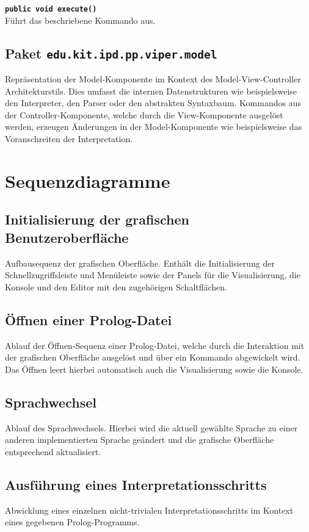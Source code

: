 \documentclass[parskip=full,11pt,twoside]{scrartcl}
\begin{document}
\textbf{\texttt{public void execute()}}\\
Führt das beschriebene Kommando aus.

\subsection{Paket \texttt{edu.kit.ipd.pp.viper.model}}
Repräsentation der Model-Komponente im Kontext des Model-View-Controller Architekturstils. Dies umfasst die internen Datenstrukturen wie beispielsweise den Interpreter, den Parser oder den abstrakten Syntaxbaum. Kommandos aus der Controller-Komponente, welche durch die View-Komponente ausgelöst werden, erzeugen Änderungen in der Model-Komponente wie beispielsweise das Voranschreiten der Interpretation.

\section{Sequenzdiagramme}

\subsection{Initialisierung der grafischen Benutzeroberfläche}
Aufbausequenz der grafischen Oberfläche. Enthält die Initialisierung der Schnellzugriffsleiste und Menüleiste sowie der Panels für die Visualisierung, die Konsole und den Editor mit den zugehörigen Schaltflächen.

\subsection{Öffnen einer Prolog-Datei}
Ablauf der Öffnen-Sequenz einer Prolog-Datei, welche durch die Interaktion mit der grafischen Oberfläche ausgelöst und über ein Kommando abgewickelt wird. Das Öffnen leert hierbei automatisch auch die Visualisierung sowie die Konsole.

\subsection{Sprachwechsel}
Ablauf des Sprachwechsels. Hierbei wird die aktuell gewählte Sprache zu einer anderen implementierten Sprache geändert und die grafische Oberfläche entsprechend aktualisiert.

\subsection{Ausführung eines Interpretationsschritts}
Abwicklung eines einzelnen nicht-trivialen Interpretationsschritts im Kontext eines gegebenen Prolog-Programms.
\end{document}
